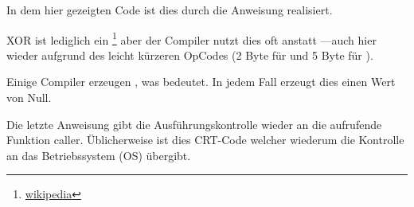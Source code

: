 In dem hier gezeigten Code ist dies durch die Anweisung  realisiert.


XOR ist lediglich ein \footnote{\href{http://go.yurichev.com/17118}{wikipedia}} aber der Compiler nutzt dies oft anstatt
---auch hier wieder aufgrund des leicht kürzeren OpCodes (2 Byte für \XOR und 5 Byte für \MOV).

Einige Compiler erzeugen , was  \EAX {} \EAX bedeutet.
In jedem Fall erzeugt dies einen Wert von Null.

Die letzte Anweisung \RET gibt die Ausführungskontrolle wieder an die aufrufende Funktion \gls{caller}.
Üblicherweise ist dies \CCpp \ac{CRT}-Code welcher wiederum die Kontrolle an das Betriebssystem (\ac{OS}) übergibt.
